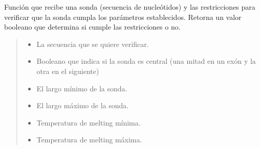 \documentclass[letterpaper,10pt,spanish]{sphinxmanual}
\begin{document}
\begin{fulllineitems}
\label{\detokenize{diseno:diseno.check_probe}}
\pysigstartsignatures
{}
\pysigstopsignatures
\sphinxAtStartPar
Función que recibe una sonda (secuencia de nucleótidos) y las restricciones para verificar que la
sonda cumpla los parámetros establecidos.
Retorna un valor booleano que determina si cumple las restricciones o no.
\begin{quote}\begin{description}
\begin{itemize}
\item {} 
\sphinxAtStartPar
{} \textendash{} La secuencia que se quiere verificar.

\item {} 
\sphinxAtStartPar
{} \textendash{} Booleano que indica si la sonda es central (una mitad en un exón y la otra en el siguiente)

\item {} 
\sphinxAtStartPar
{} \textendash{} El largo mínimo de la sonda.

\item {} 
\sphinxAtStartPar
{} \textendash{} El largo máximo de la sonda.

\item {} 
\sphinxAtStartPar
{} \textendash{} Temperatura de melting mínima.

\item {} 
\sphinxAtStartPar
{} \textendash{} Temperatura de melting máxima.


\end{itemize}
\end{description}
\end{quote}
\end{fulllineitems}
\end{document}
